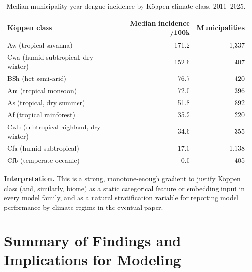 \documentclass[11pt]{report}
\begin{document}
\begin{table}[htbp]
\centering
\begin{tabular}{@{}lrr@{}}
\toprule
\textbf{K\"oppen class} & \textbf{Median incidence /100k} & \textbf{Municipalities} \\
\midrule
Aw (tropical savanna) & 171.2 & 1{,}337 \\
Cwa (humid subtropical, dry winter) & 152.6 & 407 \\
BSh (hot semi-arid) & 76.7 & 420 \\
Am (tropical monsoon) & 72.0 & 396 \\
As (tropical, dry summer) & 51.8 & 892 \\
Af (tropical rainforest) & 35.2 & 220 \\
Cwb (subtropical highland, dry winter) & 34.6 & 355 \\
Cfa (humid subtropical) & 17.0 & 1{,}138 \\
Cfb (temperate oceanic) & 0.0 & 405 \\
\bottomrule
\end{tabular}
\caption{Median municipality-year dengue incidence by K\"oppen climate class, 2011--2025.}
\label{tab:koppen}
\end{table}

\textbf{Interpretation.} This is a strong, monotone-enough gradient to justify K\"oppen class (and, similarly, biome) as a static categorical feature or embedding input in every model family, and as a natural stratification variable for reporting model performance by climate regime in the eventual paper.

\chapter{Summary of Findings and Implications for Modeling}
\end{document}
